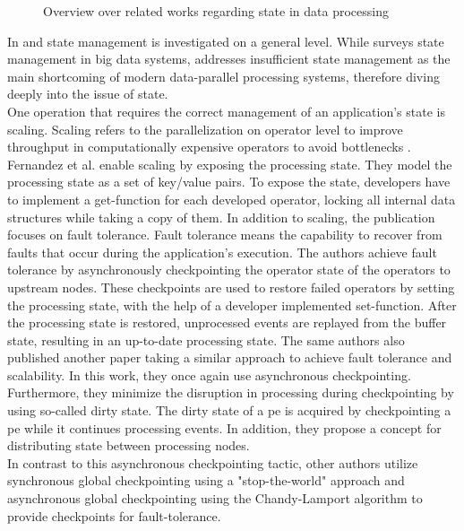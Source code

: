 \begin{figure}[H]
\graphicspath{{./figures/code/}}

\caption{Overview over related works regarding state in data processing}
\label{fOverviewLiteratureState}
\end{figure}

In \cite{CastroFernandez.2016} and \cite{To.2017} state management is investigated on a general level. While \cite{To.2017} surveys state management in big data systems, \cite{CastroFernandez.2016} addresses insufficient state management as the main shortcoming of modern data-parallel processing systems, therefore diving deeply into the issue of state.\\
One operation that requires the correct management of an application's state is scaling. Scaling refers to the parallelization on operator level to improve throughput in computationally expensive operators to avoid bottlenecks \cite{CastroFernandez.2013}. Fernandez et al. \cite{CastroFernandez.2013} enable scaling by exposing the processing state. They model the processing state as a set of key/value pairs. To expose the state, developers have to implement a get-function for each developed operator, locking all internal data structures while taking a copy of them. In addition to scaling, the publication focuses on fault tolerance. Fault tolerance means the capability to recover from faults that occur during the application's execution. The authors achieve fault tolerance by asynchronously checkpointing the operator state of the operators to upstream nodes. These checkpoints are used to restore failed operators by setting the processing state, with the help of a developer implemented set-function. After the processing state is restored, unprocessed events are replayed from the buffer state, resulting in an up-to-date processing state. The same authors also published another paper \cite{Gibson.2014} taking a similar approach to achieve fault tolerance and scalability. In this work, they once again use asynchronous checkpointing. Furthermore, they minimize the disruption in processing during checkpointing by using so-called dirty state. The dirty state of a \gls{pe} is acquired by checkpointing a \gls{pe} while it continues processing events. In addition, they propose a concept for distributing state between processing nodes.\\
In contrast to this asynchronous checkpointing tactic, other authors utilize synchronous global checkpointing using a "stop-the-world" approach \cite{Murray.2013} and asynchronous global checkpointing using the Chandy-Lamport algorithm \cite{Chandy.1985, Power.2010} to provide checkpoints for fault-tolerance.\\
